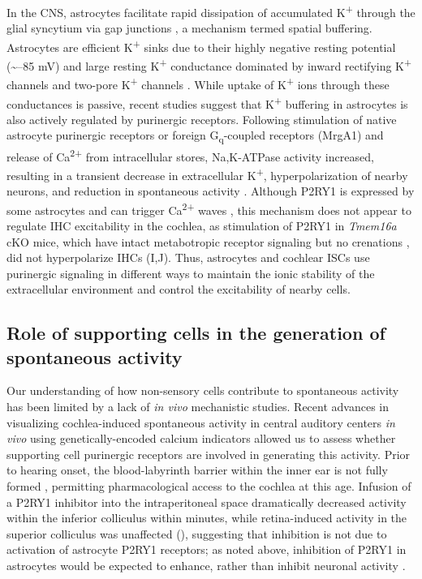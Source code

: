 \documentclass[9pt,lineno]{elife}
\begin{document}
In the CNS, astrocytes facilitate rapid dissipation of accumulated K\textsuperscript{+} through the glial syncytium via gap junctions \citep{Kofuji2004}, a mechanism termed spatial buffering. Astrocytes are efficient K\textsuperscript{+} sinks due to their highly negative resting potential (\textasciitilde --85 mV) and large resting K\textsuperscript{+} conductance dominated by inward rectifying K\textsuperscript{+} channels and two-pore K\textsuperscript{+} channels \citep{Ryoo2016,Olsen2012}. While uptake of K\textsuperscript{+} ions through these conductances is passive, recent studies suggest that K\textsuperscript{+} buffering in astrocytes is also actively regulated by purinergic receptors. Following stimulation of native astrocyte purinergic receptors or foreign G\textsubscript{q}-coupled receptors (MrgA1) and release of Ca\textsuperscript{2+} from intracellular stores, Na,K-ATPase activity increased, resulting in a transient decrease in extracellular K\textsuperscript{+}, hyperpolarization of nearby neurons, and reduction in spontaneous activity \citep{Wang2012}. Although P2RY1 is expressed by some astrocytes and can trigger Ca\textsuperscript{2+} waves \citep{Gallagher2003}, this mechanism does not appear to regulate IHC excitability in the cochlea, as stimulation of P2RY1 in \textit{Tmem16a} cKO mice, which have intact metabotropic receptor signaling but no crenations \citep{Wang2015}, did not hyperpolarize IHCs (I,J). Thus, astrocytes and cochlear ISCs use purinergic signaling in different ways to maintain the ionic stability of the extracellular environment and control the excitability of nearby cells.

\subsection{Role of supporting cells in the generation of spontaneous activity}
Our understanding of how non-sensory cells contribute to spontaneous activity has been limited by a lack of \textit{in vivo} mechanistic studies. Recent advances in visualizing cochlea-induced spontaneous activity in central auditory centers \textit{in vivo} using genetically-encoded calcium indicators \citep{Babola2018} allowed us to assess whether supporting cell purinergic receptors are involved in generating this activity. Prior to hearing onset, the blood-labyrinth barrier within the inner ear is not fully formed \citep{Suzuki1998}, permitting pharmacological access to the cochlea at this age. Infusion of a P2RY1 inhibitor into the intraperitoneal space dramatically decreased activity within the inferior colliculus within minutes, while retina-induced activity in the superior colliculus \citep{Ackman2012} was unaffected (), suggesting that inhibition is not due to activation of astrocyte P2RY1 receptors; as noted above, inhibition of P2RY1 in astrocytes would be expected to enhance, rather than inhibit neuronal activity \citep{Wang2012}. 
\end{document}
